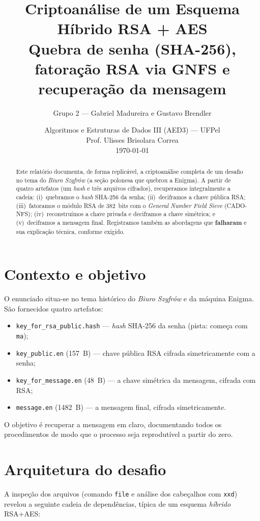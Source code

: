 \documentclass[11pt,a4paper]{article}
\title{\textbf{Criptoanálise de um Esquema Híbrido RSA + AES}\\[4pt]
\large Quebra de senha (SHA-256), fatoração RSA via GNFS e recuperação da mensagem}
\author{Grupo 2 --- Gabriel Madureira e Gustavo Brendler}
\date{Algoritmos e Estruturas de Dados III (AED3) --- UFPel\\
Prof. Ulisses Brisolara Correa\\[2pt]\today}
\begin{document}
\maketitle
\thispagestyle{fancy}

\begin{abstract}
\noindent Este relatório documenta, de forma replicável, a criptoanálise completa de um
desafio no tema do \emph{Biuro Szyfrów} (a seção polonesa que quebrou a Enigma). A partir de
quatro artefatos (um \emph{hash} e três arquivos cifrados), recuperamos integralmente a cadeia:
(i)~quebramos o \emph{hash} SHA-256 da senha; (ii)~deciframos a chave pública RSA; (iii)~fatoramos
o módulo RSA de 382~bits com o \emph{General Number Field Sieve} (CADO-NFS); (iv)~reconstruímos a
chave privada e deciframos a chave simétrica; e (v)~deciframos a mensagem final. Registramos
também as abordagens que \textbf{falharam} e sua explicação técnica, conforme exigido.
\end{abstract}

\tableofcontents
\bigskip

\section{Contexto e objetivo}
O enunciado situa-se no tema histórico do \emph{Biuro Szyfrów} e da máquina Enigma. São fornecidos
quatro artefatos:
\begin{itemize}[nosep]
  \item \texttt{key\_for\_rsa\_public.hash} --- \emph{hash} SHA-256 da senha (pista: começa com \texttt{ma});
  \item \texttt{key\_public.en} (157~B) --- chave pública RSA cifrada simetricamente com a senha;
  \item \texttt{key\_for\_message.en} (48~B) --- a chave simétrica da mensagem, cifrada com RSA;
  \item \texttt{message.en} (1482~B) --- a mensagem final, cifrada simetricamente.
\end{itemize}
O objetivo é recuperar a mensagem em claro, documentando todos os procedimentos de modo que o
processo seja reprodutível a partir do zero.

\section{Arquitetura do desafio}
A inspeção dos arquivos (comando \texttt{file} e análise dos cabeçalhos com \texttt{xxd}) revelou a
seguinte cadeia de dependências, típica de um esquema \emph{híbrido} RSA+AES:
\end{document}
